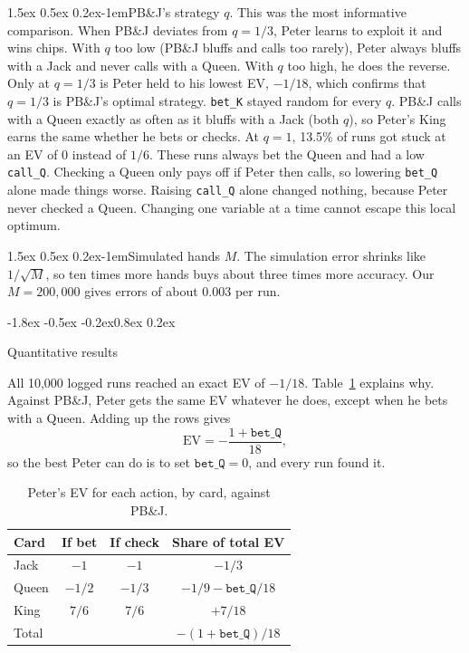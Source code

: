 \documentclass{article}
\makeatletter
\renewcommand{\subsection}{\@startsection{subsection}{2}{\z@}%
    {-1.8ex \@plus -0.5ex \@minus -0.2ex}{0.8ex \@plus 0.2ex}%
    {\normalsize\bf\raggedright}}
\renewcommand{\paragraph}{\@startsection{paragraph}{4}{\z@}%
    {1.5ex \@plus 0.5ex \@minus 0.2ex}{-1em}{\normalsize\bf}}
\newcommand{\code}[1]{\texttt{#1}}
\newcommand{\peter}{Peter}
\newcommand{\pbj}{PB\&J}
\makeatother
\begin{document}
\paragraph{\pbj's strategy $q$.} This was the most informative comparison.
When \pbj{} deviates from $q = 1/3$, \peter{} learns to exploit it and wins
chips. With $q$ too low (\pbj{} bluffs and calls too rarely), \peter{} always
bluffs with a Jack and never calls with a Queen. With $q$ too high, he does the
reverse. Only at $q = 1/3$ is \peter{} held to his lowest EV, $-1/18$, which
confirms that $q = 1/3$ is \pbj's optimal strategy. \code{bet\_K} stayed random
for every $q$. \pbj{} calls with a Queen exactly as often as it bluffs with a
Jack (both $q$), so \peter's King earns the same whether he bets or checks. At
$q = 1$, 13.5\% of runs got stuck at an EV of $0$ instead of $1/6$. These runs
always bet the Queen and had a low \code{call\_Q}. Checking a Queen only pays
off if \peter{} then calls, so lowering \code{bet\_Q} alone made things worse.
Raising \code{call\_Q} alone changed nothing, because \peter{} never checked a
Queen. Changing one variable at a time cannot escape this local optimum.

\paragraph{Simulated hands $M$.} The simulation error shrinks like
$1/\sqrt{M}$, so ten times more hands buys about three times more accuracy.
Our $M = 200{,}000$ gives errors of about $0.003$ per run.

\subsection{Quantitative results}
\label{sec:quant}

All 10{,}000 logged runs reached an exact EV of $-1/18$. Table~\ref{tab:indiff}
explains why. Against \pbj, \peter{} gets the same EV whatever he does, except
when he bets with a Queen. Adding up the rows gives
\[
  \text{EV} = -\frac{1 + \code{bet\_Q}}{18},
\]
so the best \peter{} can do is to set $\code{bet\_Q} = 0$, and every run
found it.

\begin{table}[htb]
\centering
\small
\caption{\peter's EV for each action, by card, against \pbj.}
\label{tab:indiff}
\setlength{\tabcolsep}{4pt}
\begin{tabular}{lccc}
\toprule
Card & If bet & If check & Share of total EV \\
\midrule
Jack  & $-1$   & $-1$   & $-1/3$ \\
Queen & $-1/2$ & $-1/3$ & $-1/9 - \code{bet\_Q}/18$ \\
King  & $7/6$  & $7/6$  & $+7/18$ \\
\midrule
Total & & & $-(1 + \code{bet\_Q})/18$ \\
\bottomrule
\end{tabular}
\end{table}
\end{document}
